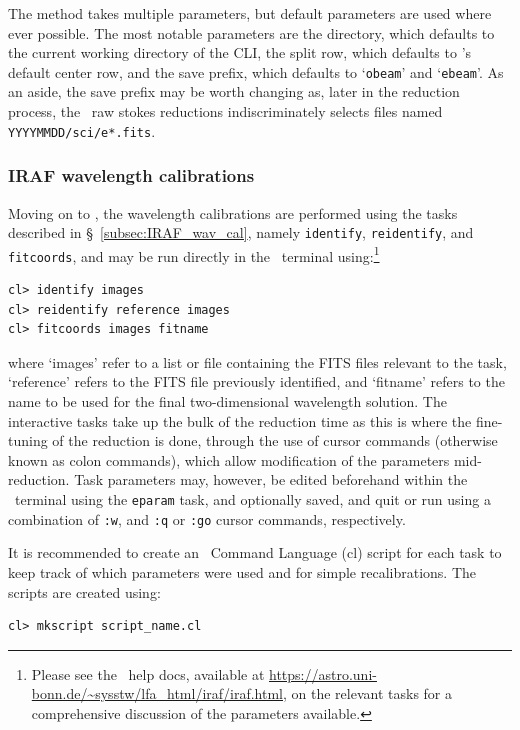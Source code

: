 The method takes multiple parameters, but default parameters are used where ever possible. The most notable parameters are the directory, which defaults to the current working directory of the \gls{CLI}, the split row, which defaults to \polsalt's default center row, and the save prefix, which defaults to `\texttt{obeam}' and `\texttt{ebeam}'. As an aside, the save prefix may be worth changing as, later in the reduction process, the \polsalt\ raw stokes reductions indiscriminately selects files named \texttt{YYYYMMDD/sci/e*.fits}.


\subsubsection{IRAF wavelength calibrations}

Moving on to \iraf, the wavelength calibrations are performed using the tasks described in \S~\ref{subsec:IRAF_wav_cal}, namely \texttt{identify}, \texttt{reidentify}, and \texttt{fitcoords}, and may be run directly in the \iraf\ terminal using:\footnote{Please see the \iraf\ help docs, available at \url{https://astro.uni-bonn.de/~sysstw/lfa_html/iraf/iraf.html}, on the relevant tasks for a comprehensive discussion of the parameters available.}

\begin{verbatim}
cl> identify images
cl> reidentify reference images
cl> fitcoords images fitname
\end{verbatim}

\noindent where `images' refer to a list or file containing the \gls{FITS} files relevant to the task, `reference' refers to the \gls{FITS} file previously identified, and `fitname' refers to the name to be used for the final two-dimensional wavelength solution. The interactive tasks take up the bulk of the reduction time as this is where the fine-tuning of the reduction is done, through the use of cursor commands (otherwise known as colon commands), which allow modification of the parameters mid-reduction. Task parameters may, however, be edited beforehand within the \iraf\ terminal using the \texttt{eparam} task, and optionally saved, and quit or run using a combination of \texttt{:w}, and \texttt{:q} or \texttt{:go} cursor commands, respectively.
\prgph

It is recommended to create an \iraf\ Command Language (cl) script for each task to keep track of which parameters were used and for simple recalibrations. The scripts are created using:

\begin{verbatim}cl> mkscript script_name.cl\end{verbatim}

